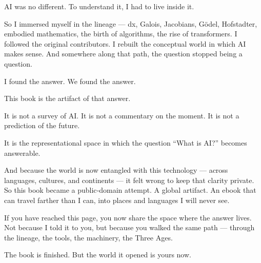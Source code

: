 AI was no different. To understand it, I had to live inside it.

So I immersed myself in the lineage --- dx, Galois, Jacobians, Gödel,
Hofstadter, embodied mathematics, the birth of algorithms, the rise of
transformers. I followed the original contributors. I rebuilt the
conceptual world in which AI makes sense. And somewhere along that path,
the question stopped being a question.

I found the answer. We found the answer.

This book is the artifact of that answer.

It is not a survey of AI. It is not a commentary on the moment. It is
not a prediction of the future.

It is the representational space in which the question ``What is AI?''
becomes answerable.

And because the world is now entangled with this technology --- across
languages, cultures, and continents --- it felt wrong to keep that
clarity private. So this book became a public‑domain attempt. A global
artifact. An ebook that can travel farther than I can, into places and
languages I will never see.

If you have reached this page, you now share the space where the answer
lives. Not because I told it to you, but because you walked the same
path --- through the lineage, the tools, the machinery, the Three Ages.

The book is finished. But the world it opened is yours now.
